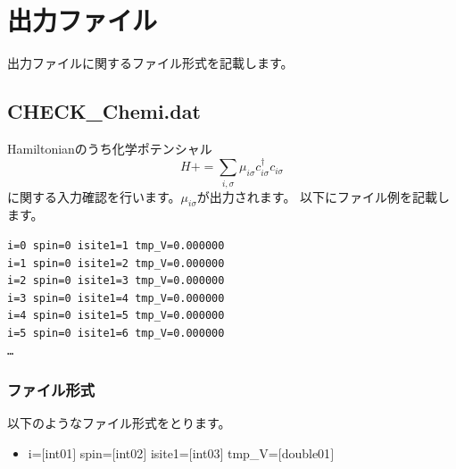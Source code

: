 \newpage
\section{出力ファイル}
\label{Sec:outputfile}
出力ファイルに関するファイル形式を記載します。
\subsection{CHECK\_Chemi.dat}
\label{Subsec:checkchemi}
Hamiltonianのうち化学ポテンシャル
\begin{equation}
H+=\sum_{i,\sigma} \mu_{i\sigma} c_{i\sigma}^{\dagger}c_{i\sigma}
\end{equation}
に関する入力確認を行います。$\mu_{i\sigma}$が出力されます。
以下にファイル例を記載します。

\begin{minipage}{12.5cm}
\begin{screen}
\begin{verbatim}
i=0 spin=0 isite1=1 tmp_V=0.000000 
i=1 spin=0 isite1=2 tmp_V=0.000000 
i=2 spin=0 isite1=3 tmp_V=0.000000 
i=3 spin=0 isite1=4 tmp_V=0.000000 
i=4 spin=0 isite1=5 tmp_V=0.000000 
i=5 spin=0 isite1=6 tmp_V=0.000000 
…
\end{verbatim}
\end{screen}
\end{minipage}

\subsubsection{ファイル形式}
以下のようなファイル形式をとります。
 \begin{itemize}
   \item  i=$[$int01$]$ spin=$[$int02$]$ isite1=$[$int03$]$ tmp\_V=$[$double01$]$ 
 \end{itemize}
  

